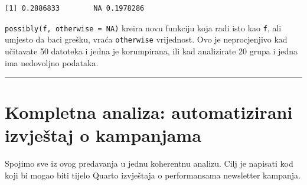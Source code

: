 \documentclass[
  croatian,
  letterpaper,
  DIV=11,
  numbers=noendperiod]{scrartcl}
\newenvironment{Shaded}{\begin{snugshade}}{\end{snugshade}}
\newcommand{\AttributeTok}[1]{\textcolor[rgb]{0.40,0.45,0.13}{#1}}
\newcommand{\CommentTok}[1]{\textcolor[rgb]{0.37,0.37,0.37}{#1}}
\newcommand{\ConstantTok}[1]{\textcolor[rgb]{0.56,0.35,0.01}{#1}}
\newcommand{\ControlFlowTok}[1]{\textcolor[rgb]{0.00,0.23,0.31}{\textbf{#1}}}
\newcommand{\DecValTok}[1]{\textcolor[rgb]{0.68,0.00,0.00}{#1}}
\newcommand{\FunctionTok}[1]{\textcolor[rgb]{0.28,0.35,0.67}{#1}}
\newcommand{\NormalTok}[1]{\textcolor[rgb]{0.00,0.23,0.31}{#1}}
\newcommand{\OtherTok}[1]{\textcolor[rgb]{0.00,0.23,0.31}{#1}}
\newcommand{\SpecialCharTok}[1]{\textcolor[rgb]{0.37,0.37,0.37}{#1}}
\newcommand{\StringTok}[1]{\textcolor[rgb]{0.13,0.47,0.30}{#1}}
\begin{document}
\begin{Shaded}
\end{Shaded}

\begin{verbatim}
[1] 0.2886833        NA 0.1978286
\end{verbatim}

\texttt{possibly(f,\ otherwise\ =\ NA)} kreira novu funkciju koja radi
isto kao \texttt{f}, ali umjesto da baci grešku, vraća
\texttt{otherwise} vrijednost. Ovo je neprocjenjivo kad učitavate 50
datoteka i jedna je korumpirana, ili kad analizirate 20 grupa i jedna
ima nedovoljno podataka.

\begin{center}\rule{0.5\linewidth}{0.5pt}\end{center}

\section{Kompletna analiza: automatizirani izvještaj o
kampanjama}\label{sec-kompletna}

Spojimo sve iz ovog predavanja u jednu koherentnu analizu. Cilj je
napisati kod koji bi mogao biti tijelo Quarto izvještaja o performansama
newsletter kampanja.
\end{document}
